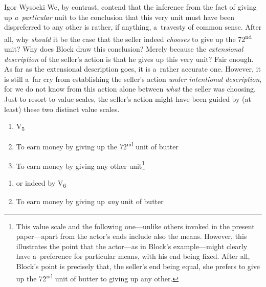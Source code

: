 \begin{artengenv}{Igor Wysocki}
We, by contrast, contend that the inference from the fact of giving up \textit{a~particular} unit to the conclusion that this very unit must have been dispreferred to any other is rather, if anything, a~travesty of common sense. After all, why \textit{should} it be the case that the seller indeed \textit{chooses} to give up the 72\textsuperscript{nd} unit? Why does Block draw this conclusion? Merely because the \textit{extensional description} of the seller's action is that he gives up this very unit? Fair enough. As far as the extensional description goes, it is a~rather accurate one. However, it is still a~far cry from establishing the seller's action \textit{under intentional description}, for we do not know from this action alone between \textit{what} the seller was choosing. Just to resort to value scales, the seller's action might have been guided by (at least) these two distinct value scales.






\begin{enumerate}[label=(\arabic*)]

\item[]\makebox[-1.7em][l]{}V\textsubscript{5}

\item To earn money by giving up the 72\textsuperscript{nd }unit of butter

\item To earn money by giving any other unit\footnote{This value scale and the following one---unlike others invoked in the present paper---apart from the actor's ends include also the means. However, this illustrates the point that the actor---as in Block's example---might clearly have a~preference for particular means, with his end being fixed. After all, Block's point is precisely that, the seller's end being equal, she prefers to give up the 72\textsuperscript{nd} unit of butter to giving up any other. }

\end{enumerate}




\begin{enumerate}[label=(\arabic*)]

\item[]\makebox[-1.7em][l]{}or indeed by V\textsubscript{6}

\item To earn money by giving up \textit{any} unit of butter


\end{enumerate}
\end{artengenv}
